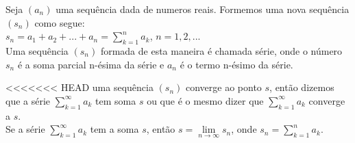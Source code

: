 \begin{df}
	Seja $\left( a_{n}\right) $ uma sequência dada de numeros reais. Formemos uma nova sequência $\left( s_{n}\right) $ como segue:\\
	$s_{n}=a_{1}+a_{2}+...+a_{n}=\sum_{k=1}^{n} a_{k}$, $n=1,2,...$\\
	Uma sequência $\left( s_{n}\right)$ formada de esta maneira é chamada série, onde o número $s_{n}$ é a soma parcial n-ésima da série e $a_{n}$ é o termo n-ésimo da série.
\end{df}
\begin{df}
<<<<<<< HEAD
	uma sequência $\left( s_{n}\right)$ converge ao ponto $s$, então dizemos que a série $\sum_{k=1}^{\infty} a_{k}$ tem soma $s$ ou que é o mesmo dizer que $\sum_{k=1}^{\infty} a_{k}$ converge a $s$.\\
	Se a série $\sum_{k=1}^{\infty} a_{k}$ tem a soma $s$, então $s=\lim\limits_{n\longrightarrow \infty} s_{n}$, onde $s_{n}=\sum_{k=1}^{n} a_{k}$.
\end{df}
